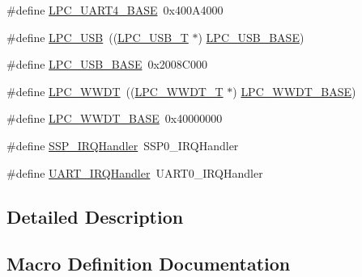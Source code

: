 \begin{DoxyCompactItemize}
\item 
\#define \hyperlink{group__PERIPH__407X__8X__BASE_ga52bf68ce53e20c93366ba5496e98f5c8}{L\+P\+C\+\_\+\+U\+A\+R\+T4\+\_\+\+B\+A\+SE}~0x400\+A4000
\item 
\#define \hyperlink{group__PERIPH__407X__8X__BASE_gae77538a7f3f4850715c95283e38b423f}{L\+P\+C\+\_\+\+U\+SB}~((\hyperlink{structLPC__USB__T}{L\+P\+C\+\_\+\+U\+S\+B\+\_\+T}              $\ast$) \hyperlink{group__PERIPH__407X__8X__BASE_gaa619008881e9f76dc31131313eff1b79}{L\+P\+C\+\_\+\+U\+S\+B\+\_\+\+B\+A\+SE})
\item 
\#define \hyperlink{group__PERIPH__407X__8X__BASE_gaa619008881e9f76dc31131313eff1b79}{L\+P\+C\+\_\+\+U\+S\+B\+\_\+\+B\+A\+SE}~0x2008\+C000
\item 
\#define \hyperlink{group__PERIPH__407X__8X__BASE_ga235e068b1412366044449dba68194c55}{L\+P\+C\+\_\+\+W\+W\+DT}~((\hyperlink{structLPC__WWDT__T}{L\+P\+C\+\_\+\+W\+W\+D\+T\+\_\+T}             $\ast$) \hyperlink{group__PERIPH__407X__8X__BASE_ga9b83c39ba53f9c9e87974984c96e35de}{L\+P\+C\+\_\+\+W\+W\+D\+T\+\_\+\+B\+A\+SE})
\item 
\#define \hyperlink{group__PERIPH__407X__8X__BASE_ga9b83c39ba53f9c9e87974984c96e35de}{L\+P\+C\+\_\+\+W\+W\+D\+T\+\_\+\+B\+A\+SE}~0x40000000
\item 
\#define \hyperlink{group__PERIPH__407X__8X__BASE_gac4eb0fc5d2f19b89fa77194876b63df4}{S\+S\+P\+\_\+\+I\+R\+Q\+Handler}~S\+S\+P0\+\_\+\+I\+R\+Q\+Handler
\item 
\#define \hyperlink{group__PERIPH__407X__8X__BASE_gaf6a20f8c9320377f3713d96ea90bfd10}{U\+A\+R\+T\+\_\+\+I\+R\+Q\+Handler}~U\+A\+R\+T0\+\_\+\+I\+R\+Q\+Handler
\end{DoxyCompactItemize}


\subsection{Detailed Description}


\subsection{Macro Definition Documentation}
